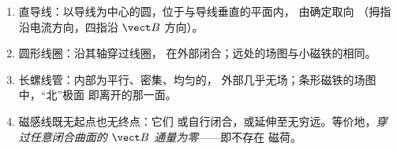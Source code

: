 \begin{proposition}[场图]\label{prop:b1:magnetostatics:maps}
\begin{enumerate}
  \item 直导线：以导线为中心的圆，位于与导线垂直的平面内，
        由\emph{}确定取向
        （拇指沿电流方向，四指沿 $\vect B$ 方向）。
  \item 圆形线圈：沿其轴穿过线圈，
        在外部闭合；远处的场图与小磁铁的相同。
  \item 长螺线管：内部为平行、密集、均匀的，
        外部几乎无场；条形磁铁的场图中，“北”极面
        即离开的那一面。
  \item 磁感线既无起点也无终点：它们
        或自行闭合，或延伸至无穷远。等价地，\emph{穿过任意闭合曲面的
        $\vect B$ 通量为零}——即不存在
        磁荷。
\end{enumerate}
\end{proposition}
\admitted

